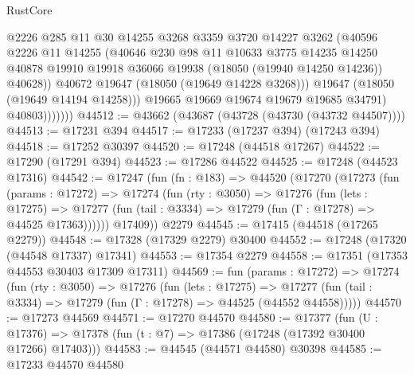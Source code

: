 \begin{lexlean}{RustCore}
\begin{coremodule}
                        @2226
                        @285
                        @11
                        @30
                        @14255
                        @3268
                        @3359
                        @3720
                        @14227
                        @3262
                        (@40596
                          @2226
                          @11
                          @14255
                          (@40646
                            @230
                            @98
                            @11
                            @10633
                            @3775
                            @14235
                            @14250
                            @40878
                            @19910
                            @19918
                            @36066
                            @19938
                            (@18050 (@19940 @14250 @14236))
                            @40628))
                        @40672
                        @19647
                        (@18050 (@19649 @14228 @3268)))
                      @19647
                      (@18050 (@19649 @14194 @14258)))
                    @19665
                    @19669
                    @19674
                    @19679
                    @19685
                    @34791)
                  @40803)))))))
@44512 := @43662 (@43687 (@43728 (@43730 (@43732 @44507))))
@44513 := @17231 @394
@44517 := @17233 (@17237 @394) (@17243 @394)
@44518 := @17252 @30397
@44520 := @17248 (@44518 @17267)
@44522 := @17290 (@17291 @394)
@44523 := @17286 @44522
@44525 := @17248 (@44523 @17316)
@44542 := @17247
    (fun (fn : @183) =>
    @44520
      (@17270
        (@17273
          (fun (params : @17272) =>
          @17274
            (fun (rty : @3050) =>
            @17276
              (fun (lets : @17275) =>
              @17277 (fun (tail : @3334) => @17279 (fun (Γ : @17278) => @44525 @17363))))))
        @17409))
    @2279
@44545 := @17415 (@44518 (@17265 @2279))
@44548 := @17328 (@17329 @2279) @30400
@44552 := @17248 (@17320 (@44548 @17337) @17341)
@44553 := @17354 @2279
@44558 := @17351 (@17353 @44553 @30403 @17309 @17311)
@44569 := fun (params : @17272) =>
  @17274
    (fun (rty : @3050) =>
    @17276
      (fun (lets : @17275) =>
      @17277 (fun (tail : @3334) => @17279 (fun (Γ : @17278) => @44525 (@44552 @44558)))))
@44570 := @17273 @44569
@44571 := @17270 @44570
@44580 := @17377
    (fun (U : @17376) => @17378 (fun (t : @7) => @17386 (@17248 (@17392 @30400 @17266) @17403)))
@44583 := @44545 (@44571 @44580) @30398
@44585 := @17233 @44570 @44580

\end{coremodule}
\end{lexlean}
